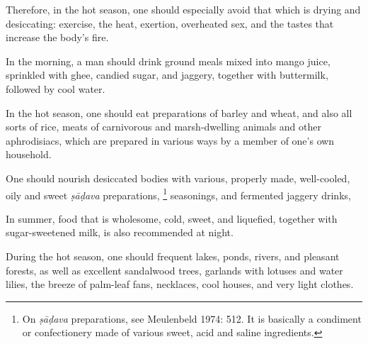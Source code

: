 \begin{translation}
\item[55-56ab]
Therefore, in the hot season, one should especially avoid that which is drying and desiccating: %
exercise, the heat, exertion, overheated sex, %
and the tastes that increase the body's fire. %

\item[56cd-57ab]
In the morning, a man should drink ground meals  %
mixed into mango juice, %
sprinkled with %
ghee, candied sugar, %
and jaggery, %
together with buttermilk, %
followed by cool water. %

\item[57cd-58]
In the hot season, %
one should eat preparations %
of barley and wheat, and also all sorts of rice, %
meats of carnivorous and marsh-dwelling animals %
and other aphrodisiacs, %
which are prepared in various ways %
by a member of one's own household. %

\item[59]
One should nourish %
desiccated bodies %
with various, properly made, %
well-cooled, %
oily and sweet %
\emph{ṣāḍava} preparations, %
    \footnote{On \emph{ṣāḍava} preparations, see Meulenbeld 1974: 512. It is basically a condiment or confectionery made of various sweet, acid and saline ingredients.}
seasonings, %
and fermented jaggery drinks, %

\item[60]
In summer, food that is wholesome, cold, sweet, and liquefied, %
together with sugar-sweetened milk, %
is also recommended at night.

\item[61--62]
During the hot season, one should frequent lakes, ponds, %
rivers, and pleasant forests, as well as excellent sandalwood trees, %
garlands with lotuses and water lilies, %
the breeze of palm-leaf fans,  %
necklaces, %
cool houses, %
and very light clothes. 


\end{translation}
